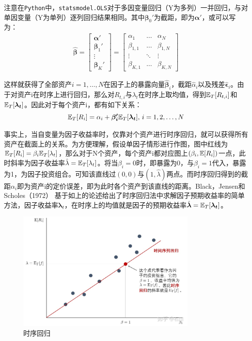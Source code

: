 \documentclass[11pt]{article}
\begin{document}
注意在\verb|Python|中，\verb|statsmodel.OLS|对于多因变量回归（Y为多列）一并回归，与对单因变量（Y为单列）逐列回归结果相同。其中$\bm{\beta}_{0}'$为截距，即为$\bm{\alpha}'$，或可以写为：
\begin{gather*}
    \hat{\bm{\beta}}
    = \begin{bmatrix} \bm{\alpha}' \\ \bm{\beta}_{1}' \\ \vdots \\ \bm{\beta}_{K}' \end{bmatrix}
    = \begin{bmatrix} \alpha_{1} & \dots & \alpha_{N} \\ \beta_{1,1} & \dots & \beta_{1,N} \\ \vdots & \ddots & \vdots \\ \beta_{K,1} & \dots & \beta_{K,N} \end{bmatrix}
\end{gather*}

这样就获得了全部资产$i=1,\dots,N$在因子上的暴露向量$\hat{\bm{\beta}}_i$，截距$\hat{\alpha}_i$以及残差$\hat{\bm{\epsilon}}_i$。由于对资产i在时序上进行回归，那么对$R_{t,i}$与$\lambda_t$在时序上取均值，得到$\mathbb{E}_T[R_{t,i}]$和$\mathbb{E}_T[\bm{\lambda_t}]$。因此对于每个资产i，都有如下关系：
\begin{equation*}
    \mathbb{E}_T[R_i] = \alpha_i + \bm{\beta_{i}'} \mathbb{E}_T[\bm{\lambda_t}] ,\, i=1,2,\dots,N
\end{equation*}

事实上，当自变量为因子收益率时，仅靠对个资产进行时序回归，就可以获得所有资产在截面上的关系。为方便理解，假设单因子情形进行作图，图中红线为$\mathbb{E}_T[R_i] = \beta_i \mathbb{E}_T[\lambda_t]$，那么对于N个资产，每个资产i都对应图上$(\beta_i,\mathbb{E}[R_i])$一点，此时斜率为因子收益率$\hat{\lambda}=\mathbb{E}_T[\lambda_t]$。将当$\beta_i=0$时，即暴露为0，与$\beta_i=1$代入，暴露为1，为因子投资组合。可知该直线过$(0,0)$与$(1,\hat{\lambda})$两点。而时序回归得到的截距$\alpha_i$即为资产i的定价误差，即为此时各个资产到该直线的距离。Black，Jensen和Scholes（1972） 基于如上的论述给出了时序回归法中求解因子预期收益率的简单方法，因子收益率$\bm{\lambda}_t$，在时序上的均值就是因子的预期收益率$\hat{\bm{\lambda}} = \mathbb{E}_T[\bm{\lambda_t}]$。

\begin{figure}[H]
    \centering
    \includegraphics[width=0.8\textwidth]{fig/ts_reg.jpg}
    \caption{时序回归}
    \label{fig：ts_reg}
\end{figure}
\end{document}
